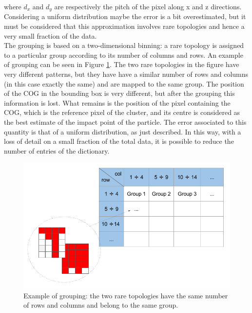 where $d_x$ and $d_y$ are respectively the pitch of the pixel along x and z directions.
Considering a uniform distribution maybe the error is a bit overestimated, but it must be considered that this approximation involves rare topologies and hence a very small fraction of the data.\\
The grouping is based on a two-dimensional binning: a rare topology is assigned to a particular group according to its number of columns and rows. An example of grouping can be seen in Figure \ref{fig:gruppi}. The two rare topologies in the figure have very different patterns, but they have have a similar number of rows and columns (in this case exactly the same) and are mapped to the same group. The position of the COG in the bounding box is very different, but after the grouping this information is lost. What remains is the position of the pixel containing the COG, which is the reference pixel of the cluster, and its centre is considered as the best estimate of the impact point of the particle. The error associated to this quantity is that of a uniform distribution, as just described. In this way, with a loss of detail on a small fraction of the total data, it is possible to reduce the number of entries of the dictionary.
%
\begin{figure}
  \centering
  \includegraphics[scale=0.5]{figures/gruppi.png}
  \caption{Example of grouping: the two rare topologies have the same number of rows and columns and belong to the same group.}
  \label{fig:gruppi}
\end{figure}
%
